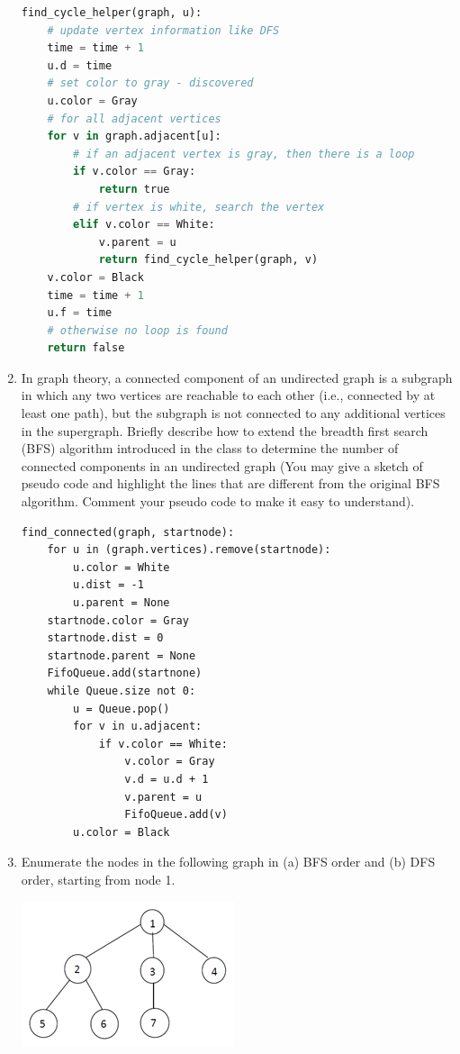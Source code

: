\documentclass{article}
\begin{document}
\begin{enumerate}
\begin{lstlisting}[language=python]
find_cycle_helper(graph, u):
    # update vertex information like DFS
    time = time + 1
    u.d = time
    # set color to gray - discovered
    u.color = Gray
    # for all adjacent vertices
    for v in graph.adjacent[u]:
        # if an adjacent vertex is gray, then there is a loop
        if v.color == Gray:
            return true
        # if vertex is white, search the vertex
        elif v.color == White:
            v.parent = u
            return find_cycle_helper(graph, v)
    v.color = Black
    time = time + 1
    u.f = time
    # otherwise no loop is found
    return false
            \end{lstlisting}
        \item In graph theory, a connected component of an undirected graph is 
        a subgraph in which any two vertices are reachable to each other 
        (i.e., connected by at least one path), but the subgraph is not 
        connected to any additional vertices in the supergraph. Briefly 
        describe how to extend the breadth first search (BFS) algorithm 
        introduced in the class to determine the number of connected 
        components in an undirected graph (You may give a sketch of pseudo 
        code and highlight the lines that are different from the original BFS 
        algorithm. Comment your pseudo code to make it easy to understand).
            \begin{lstlisting}
find_connected(graph, startnode):
    for u in (graph.vertices).remove(startnode):
        u.color = White
        u.dist = -1
        u.parent = None
    startnode.color = Gray
    startnode.dist = 0
    startnode.parent = None
    FifoQueue.add(startnone)
    while Queue.size not 0:
        u = Queue.pop()
        for v in u.adjacent:
            if v.color == White:
                v.color = Gray
                v.d = u.d + 1
                v.parent = u
                FifoQueue.add(v)
        u.color = Black
            \end{lstlisting}
        \item Enumerate the nodes in the following graph in (a) BFS order and 
        (b) DFS order, starting from node 1. 
            \begin{center}
                \includegraphics{tree1}

\end{center}
\end{enumerate}
\end{document}
